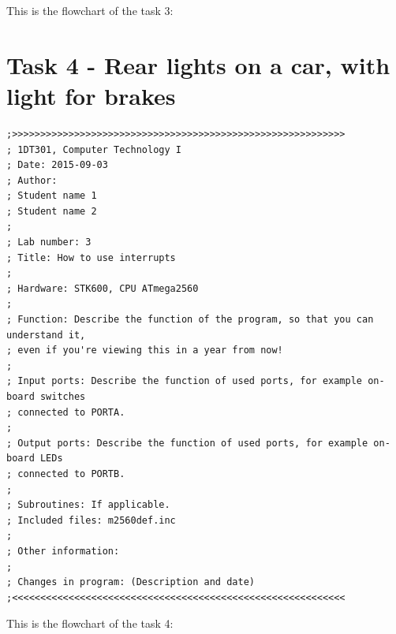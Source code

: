 \documentclass[a4paper,12pt]{article}
\begin{document}
\newpage
This is the flowchart of the task 3:
\begin{center}
\end{center}

\newpage
\section{Task 4 - Rear lights on a car, with light for brakes}

\lstset{style=Asm}
\begin{lstlisting}
;>>>>>>>>>>>>>>>>>>>>>>>>>>>>>>>>>>>>>>>>>>>>>>>>>>>>>>>>>>>
; 1DT301, Computer Technology I
; Date: 2015-09-03
; Author:
; Student name 1
; Student name 2
;
; Lab number: 3
; Title: How to use interrupts
;
; Hardware: STK600, CPU ATmega2560
;
; Function: Describe the function of the program, so that you can understand it,
; even if you're viewing this in a year from now!
;
; Input ports: Describe the function of used ports, for example on-board switches
; connected to PORTA.
;
; Output ports: Describe the function of used ports, for example on-board LEDs
; connected to PORTB.
;
; Subroutines: If applicable.
; Included files: m2560def.inc
;
; Other information:
;
; Changes in program: (Description and date)
;<<<<<<<<<<<<<<<<<<<<<<<<<<<<<<<<<<<<<<<<<<<<<<<<<<<<<<<<<<<
\end{lstlisting}

\newpage
This is the flowchart of the task 4:
\begin{center}
\end{center}


\end{document}
